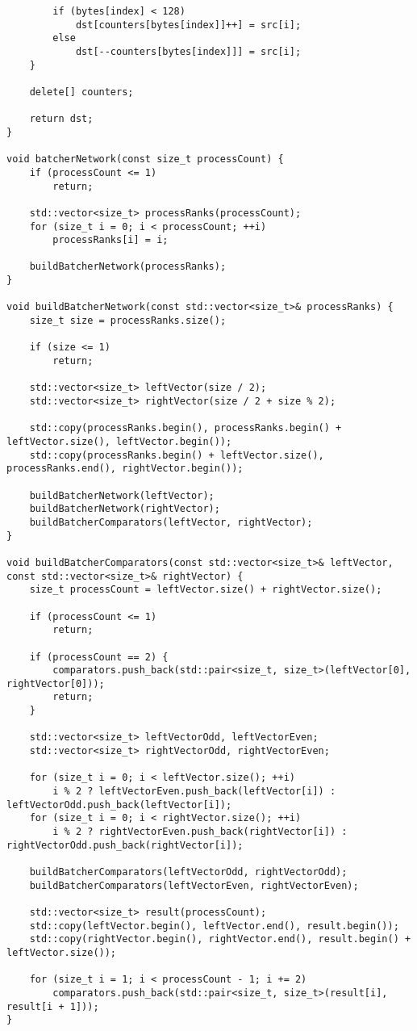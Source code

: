 \documentclass{report}
\begin{document}
\begin{lstlisting}
        if (bytes[index] < 128)
            dst[counters[bytes[index]]++] = src[i];
        else
            dst[--counters[bytes[index]]] = src[i];
    }

    delete[] counters;

    return dst;
}

void batcherNetwork(const size_t processCount) {
    if (processCount <= 1)
        return;

    std::vector<size_t> processRanks(processCount);
    for (size_t i = 0; i < processCount; ++i)
        processRanks[i] = i;

    buildBatcherNetwork(processRanks);
}

void buildBatcherNetwork(const std::vector<size_t>& processRanks) {
    size_t size = processRanks.size();

    if (size <= 1)
        return;

    std::vector<size_t> leftVector(size / 2);
    std::vector<size_t> rightVector(size / 2 + size % 2);

    std::copy(processRanks.begin(), processRanks.begin() + leftVector.size(), leftVector.begin());
    std::copy(processRanks.begin() + leftVector.size(), processRanks.end(), rightVector.begin());

    buildBatcherNetwork(leftVector);
    buildBatcherNetwork(rightVector);
    buildBatcherComparators(leftVector, rightVector);
}

void buildBatcherComparators(const std::vector<size_t>& leftVector, const std::vector<size_t>& rightVector) {
    size_t processCount = leftVector.size() + rightVector.size();

    if (processCount <= 1)
        return;

    if (processCount == 2) {
        comparators.push_back(std::pair<size_t, size_t>(leftVector[0], rightVector[0]));
        return;
    }

    std::vector<size_t> leftVectorOdd, leftVectorEven;
    std::vector<size_t> rightVectorOdd, rightVectorEven;

    for (size_t i = 0; i < leftVector.size(); ++i)
        i % 2 ? leftVectorEven.push_back(leftVector[i]) : leftVectorOdd.push_back(leftVector[i]);
    for (size_t i = 0; i < rightVector.size(); ++i)
        i % 2 ? rightVectorEven.push_back(rightVector[i]) : rightVectorOdd.push_back(rightVector[i]);

    buildBatcherComparators(leftVectorOdd, rightVectorOdd);
    buildBatcherComparators(leftVectorEven, rightVectorEven);

    std::vector<size_t> result(processCount);
    std::copy(leftVector.begin(), leftVector.end(), result.begin());
    std::copy(rightVector.begin(), rightVector.end(), result.begin() + leftVector.size());

    for (size_t i = 1; i < processCount - 1; i += 2)
        comparators.push_back(std::pair<size_t, size_t>(result[i], result[i + 1]));
}
\end{lstlisting}
\end{document}
